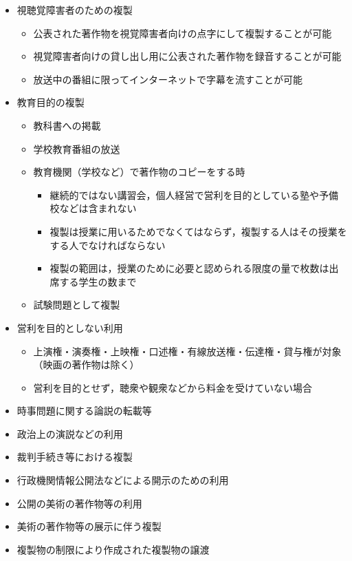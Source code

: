 \documentclass{ltjsarticle}
\begin{document}
\begin{itemize}
\begin{itemize}
      \end{itemize}
\item 視聴覚障害者のための複製
      \begin{itemize}
      \item 公表された著作物を視覚障害者向けの点字にして複製することが可能
      \item 視覚障害者向けの貸し出し用に公表された著作物を録音することが可能
      \item 放送中の番組に限ってインターネットで字幕を流すことが可能
      \end{itemize}
\item 教育目的の複製
      \begin{itemize}
      \item 教科書への掲載
      \item 学校教育番組の放送
      \item 教育機関（学校など）で著作物のコピーをする時
            \begin{itemize}
            \item 継続的ではない講習会，個人経営で営利を目的としている塾や予備校などは含まれない
            \item 複製は授業に用いるためでなくてはならず，複製する人はその授業をする人でなければならない
            \item 複製の範囲は，授業のために必要と認められる限度の量で枚数は出席する学生の数まで
            \end{itemize}
      \item 試験問題として複製
      \end{itemize}
\item 営利を目的としない利用
      \begin{itemize}
      \item 上演権・演奏権・上映権・口述権・有線放送権・伝達権・貸与権が対象（映画の著作物は除く）
      \item 営利を目的とせず，聴衆や観衆などから料金を受けていない場合
      \end{itemize}
\item 時事問題に関する論説の転載等
\item 政治上の演説などの利用
\item 裁判手続き等における複製
\item 行政機関情報公開法などによる開示のための利用
\item 公開の美術の著作物等の利用
\item 美術の著作物等の展示に伴う複製
\item 複製物の制限により作成された複製物の譲渡
\end{itemize}
\end{document}
